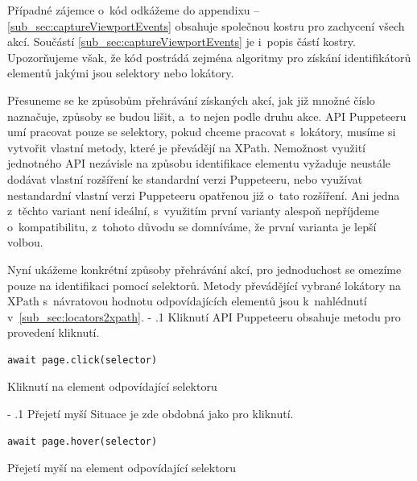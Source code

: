 \documentclass[12pt, a4paper, twoside]{article}
\makeatletter
\newcommand{\codefigureSpacing}{1.2}
\renewcommand\paragraph{%
	\@startsection{subparagraph}{5}{0mm}%
	{-\baselineskip}%
	{.1\baselineskip}%
	{\normalfont\normalsize\bfseries}}
\makeatother
\begin{document}
	Případné zájemce o~kód odkážeme do appendixu -- \ref{sub_sec:captureViewportEvents} obsahuje společnou kostru pro zachycení všech akcí. Součástí \ref{sub_sec:captureViewportEvents} je i~popis částí kostry. Upozorňujeme však, že kód postrádá zejména algoritmy pro získání identifikátorů elementů jakými jsou selektory nebo lokátory.
	
	Přesuneme se ke způsobům přehrávání získaných akcí, jak již množné číslo naznačuje, způsoby se budou lišit, a~to nejen podle druhu akce. API Puppeteeru umí pracovat pouze se selektory, pokud chceme pracovat s~lokátory, musíme si vytvořit vlastní metody, které je převádějí na XPath. Nemožnost využití jednotného API nezávisle na způsobu identifikace elementu vyžaduje neustále dodávat vlastní rozšíření ke standardní verzi Puppeteeru, nebo využívat nestandardní vlastní verzi Puppeteeru opatřenou již o~tato rozšíření. Ani jedna z~těchto variant není ideální, s~využitím první varianty alespoň nepříjdeme o~kompatibilitu, z~tohoto důvodu se domníváme, že první varianta je lepší volbou.

	Nyní ukážeme konkrétní způsoby přehrávání akcí, pro jednoduchost se omezíme pouze na identifikaci pomocí selektorů. Metody převádějící vybrané lokátory na XPath s~návratovou hodnotu odpovídajících elementů jsou k~nahlédnutí v~\ref{sub_sec:locators2xpath}.
	\paragraph{Kliknutí}
	API Puppeteeru obsahuje metodu pro provedení kliknutí.
	\nopagebreak
	\begin{codefigure}[H]
		\renewcommand\baselinestretch{\codefigureSpacing}
	\begin{lstlisting}[style=MyJavaScript]
await page.click(selector)
	\end{lstlisting}
	\caption{Kliknutí na element odpovídající selektoru}
	\end{codefigure}
	\paragraph{Přejetí myší}
	Situace je zde obdobná jako pro kliknutí.
	\nopagebreak
	\begin{codefigure}[H]
		\renewcommand\baselinestretch{\codefigureSpacing}
	\begin{lstlisting}[style=MyJavaScript]
await page.hover(selector)
	\end{lstlisting}
	\caption{Přejetí myší na element odpovídající selektoru}
	\end{codefigure}	
\end{document}
